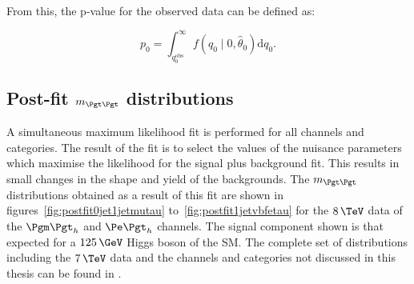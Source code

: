 From this, the p-value for the observed data can be defined as:

\begin{equation}
p_{0} =
\int_{q_{0}^{\mathrm{obs}}}^{\infty}f(q_{0}\mid0,\hat{\theta}_{0})\mathrm{d}q_{0}
.
\end{equation}


\subsection{Post-fit $m_{\Pgt\Pgt}$ distributions}

A simultaneous maximum likelihood fit is performed for all channels and
categories. The result of the fit is to select the values of the nuisance
parameters which maximise the likelihood for the signal plus background fit.
This results in small changes in the shape and yield of the backgrounds. The
$m_{\Pgt\Pgt}$ distributions obtained as a result of this fit are shown in  
figures~\ref{fig:postfit0jet1jetmutau} to~\ref{fig:postfit1jetvbfetau} 
for the $8\,\TeV$ data of the $\mutau$ and $\etau$ channels. The signal
component shown is that expected for a $125\,\GeV$ Higgs boson of the \ac{SM}.
The complete set of distributions including the $7\,\TeV$ data and the channels and categories
not discussed in this thesis can be found in \cite{HIG-13-004}.

